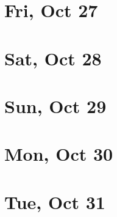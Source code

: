 	\section{Fri, Oct 27}
		
		
	\section{Sat, Oct 28}
		
		
	\section{Sun, Oct 29}
		
		
	\section{Mon, Oct 30}
		
		
	\section{Tue, Oct 31}
		
		
